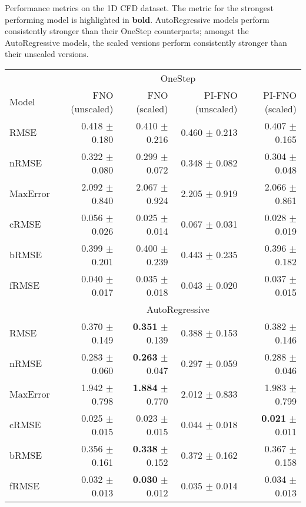 \begin{table}[h]
    \caption{Performance metrics on the 1D CFD dataset. The metric for the strongest performing model is highlighted in \textbf{bold}. AutoRegressive models perform consistently stronger than their OneStep counterparts; amongst the AutoRegressive models, the scaled versions perform consistently stronger than their unscaled versions.}
    \label{tab:1D_metrics}
\end{table}


\begin{table}[h]
    \centering
    \begin{tabular}{lrrrr}
        \toprule
              &  \multicolumn{4}{c}{OneStep} \\
        \cmidrule(lr){2-5}
        Model &  FNO (unscaled) &  FNO (scaled) &  PI-FNO (unscaled) &  PI-FNO (scaled) \\
        \midrule
        RMSE     &  0.418 $\pm$ 0.180 &  0.410 $\pm$ 0.216 &  0.460 $\pm$ 0.213 &  0.407 $\pm$ 0.165 \\
        nRMSE    &  0.322 $\pm$ 0.080 &  0.299 $\pm$ 0.072 &  0.348 $\pm$ 0.082 &  0.304 $\pm$ 0.048 \\
        MaxError &  2.092 $\pm$ 0.840 &  2.067 $\pm$ 0.924 &  2.205 $\pm$ 0.919 &  2.066 $\pm$ 0.861 \\
        cRMSE    &  0.056 $\pm$ 0.026 &  0.025 $\pm$ 0.014 &  0.067 $\pm$ 0.031 &  0.028 $\pm$ 0.019 \\
        bRMSE    &  0.399 $\pm$ 0.201 &  0.400 $\pm$ 0.239 &  0.443 $\pm$ 0.235 &  0.396 $\pm$ 0.182 \\
        fRMSE    &  0.040 $\pm$ 0.017 &  0.035 $\pm$ 0.018 &  0.043 $\pm$ 0.020 &  0.037 $\pm$ 0.015 \\
        \midrule
              &  \multicolumn{4}{c}{AutoRegressive} \\
        \cmidrule(lr){2-5}
        RMSE     &  0.370 $\pm$ 0.149 &  \textbf{0.351} $\pm$ 0.139 &  0.388 $\pm$ 0.153 &  0.382 $\pm$ 0.146 \\
        nRMSE    &  0.283 $\pm$ 0.060 &  \textbf{0.263} $\pm$ 0.047 &  0.297 $\pm$ 0.059 &  0.288 $\pm$ 0.046 \\
        MaxError &  1.942 $\pm$ 0.798 &  \textbf{1.884} $\pm$ 0.770 &  2.012 $\pm$ 0.833 &  1.983 $\pm$ 0.799 \\
        cRMSE    &  0.025 $\pm$ 0.015 &  0.023 $\pm$ 0.015 &  0.044 $\pm$ 0.018 &  \textbf{0.021} $\pm$ 0.011 \\
        bRMSE    &  0.356 $\pm$ 0.161 &  \textbf{0.338} $\pm$ 0.152 &  0.372 $\pm$ 0.162 &  0.367 $\pm$ 0.158 \\
        fRMSE    &  0.032 $\pm$ 0.013 &  \textbf{0.030} $\pm$ 0.012 &  0.035 $\pm$ 0.014 &  0.034 $\pm$ 0.013 \\
        \midrule
    \end{tabular}
    

\end{table}
